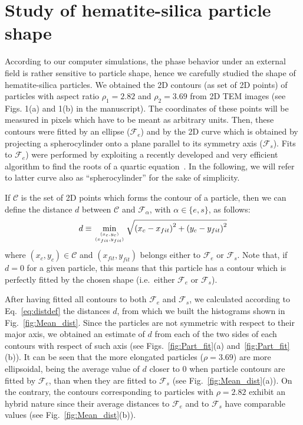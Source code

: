 \documentclass[aip,graphicx]{revtex4-1} %
\def\ontop#1#2{\genfrac{}{}{0pt}{}{#1}{#2}}
\begin{document}
\section{Study of hematite-silica particle shape}
According to our computer simulations, the phase behavior under an external field is rather sensitive to particle shape, 
hence we carefully studied the shape of hematite-silica particles.
We obtained the 2D contours (as set of 2D points) of particles with aspect ratio $\rho_1 = 2.82$ and $\rho_2 = 3.69$ from 2D TEM images 
(see Figs. 1(a) and 1(b) in the manuscript). The coordinates of these points will be measured in pixels which have to be meant as 
arbitrary units.
Then, these contours were fitted by an ellipse ($\mathcal{F}_{e}$) and by the 2D curve which is obtained by projecting a spherocylinder 
onto a plane parallel to its symmetry axis ($\mathcal{F}_{s}$). Fits to $\mathcal{F}_{e}$) were performed by exploiting a recently 
developed and very efficient algorithm to find the roots of a quartic equation~\cite{DeMicheleACM}.
In the following, we will refer to latter curve also as 
``spherocylinder'' for the sake of simplicity.

If $\mathcal{C}$ is the set of 2D points which forms the contour of a particle, then we can define the distance $d$ between
$\mathcal{C}$ and $\mathcal{F}_\alpha$, with $\alpha\in\{e,s\}$, as follows:
\begin{equation}
  d \equiv \min_{\ontop{(x_c,y_c)}{(x_{fit}, y_{fit})}} \sqrt{{(x_c - x_{fit})}^2 + {(y_c - y_{fit})}^2}\label{eq:distdef}
\end{equation}
where $(x_c,y_c)\in \mathcal{C}$ and $(x_{fit},y_{fit})$ belongs either to $\mathcal{F}_e$ or $\mathcal{F}_s$.
Note that, if $d=0$ for a given particle, this means that this particle has a contour which is perfectly fitted
by the chosen shape (i.e.~either $\mathcal{F}_e$ or $\mathcal{F}_s$).

After having fitted all contours to both $\mathcal{F}_e$ and $\mathcal{F}_s$, we calculated according to 
Eq.~\ref{eq:distdef} the distances $d$, from which we built the histograms shown in Fig.~\ref{fig:Mean_dist}.
Since the particles are not symmetric with respect to their major axis, we obtained an estimate of $d$ from each of the two 
sides of each contours with respect of such axis (see Figs.~\ref{fig:Part_fit}(a) and~\ref{fig:Part_fit}(b)).
It can be seen that the more elongated particles ($\rho = 3.69$) are more ellipsoidal, being the average value of $d$ closer
to $0$ when particle contours are fitted by $\mathcal{F}_e$, than when they are fitted to $\mathcal{F}_s$ 
(see Fig.~\ref{fig:Mean_dist}(a)). On the contrary, the contours corresponding to particles with $\rho = 2.82$ exhibit 
an hybrid nature since their average distances to $\mathcal{F}_e$ and to $\mathcal{F}_s$ have comparable values
(see Fig.~\ref{fig:Mean_dist}(b)). 
\end{document}
